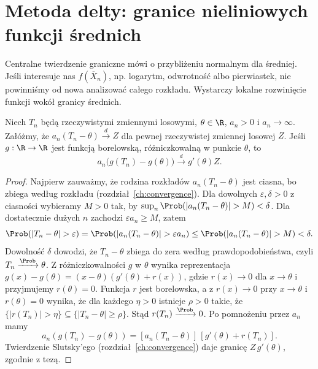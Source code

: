 \section{Metoda delty: granice nieliniowych funkcji średnich}

Centralne twierdzenie graniczne mówi o przybliżeniu
normalnym dla średniej. Jeśli interesuje nas
$f(\overline X_n)$, np. logarytm, odwrotność albo
pierwiastek, nie powinniśmy od nowa analizować
całego rozkładu. Wystarczy lokalne rozwinięcie
funkcji wokół granicy średnich.

\begin{twierdzenie}
Niech $T_n$ będą rzeczywistymi zmiennymi losowymi,
$\theta\in\R$, $a_n>0$ i $a_n\to\infty$.
Załóżmy, że $a_n(T_n-\theta)\xrightarrow d Z$
dla pewnej rzeczywistej zmiennej losowej $Z$.
Jeśli $g:\R\to\R$ jest funkcją borelowską, różniczkowalną
w punkcie $\theta$, to
\[
a_n\bigl(g(T_n)-g(\theta)\bigr)
\xrightarrow d g'(\theta)Z.
\]
\end{twierdzenie}
\begin{proof}
Najpierw zauważmy, że rodzina rozkładów
$a_n(T_n-\theta)$ jest ciasna, bo zbiega według
rozkładu (rozdział~\ref{ch:convergence}). Dla dowolnych $\varepsilon,\delta>0$ z ciasności
wybieramy $M>0$ tak, by
$\sup_n\Prob(|a_n(T_n-\theta)|>M)<\delta$.
Dla dostatecznie dużych $n$ zachodzi
$\varepsilon a_n\geq M$, zatem
\[
\Prob(|T_n-\theta|>\varepsilon)
=\Prob(|a_n(T_n-\theta)|>\varepsilon a_n)
\leq\Prob(|a_n(T_n-\theta)|>M)<\delta.
\]
Dowolność $\delta$ dowodzi, że $T_n-\theta$
zbiega do zera według prawdopodobieństwa,
czyli $T_n\xrightarrow{\Prob}\theta$.
Z różniczkowalności $g$ w $\theta$ wynika
reprezentacja
$g(x)-g(\theta)=(x-\theta)(g'(\theta)+r(x))$,
gdzie $r(x)\to0$ dla $x\to\theta$
i przyjmujemy $r(\theta)=0$.
Funkcja $r$ jest borelowska, a z $r(x)\to0$ przy
$x\to\theta$ i $r(\theta)=0$ wynika, że dla każdego
$\eta>0$ istnieje $\rho>0$ takie, że
$\{|r(T_n)|>\eta\}\subseteq\{|T_n-\theta|\geq\rho\}$.
Stąd $r(T_n)\xrightarrow{\Prob}0$.
Po pomnożeniu przez $a_n$ mamy
\[
a_n(g(T_n)-g(\theta))
=[a_n(T_n-\theta)]\,[g'(\theta)+r(T_n)].
\]
Twierdzenie Slutsky'ego (rozdział~\ref{ch:convergence})
daje granicę $Z\,g'(\theta)$, zgodnie z tezą.
\end{proof}

